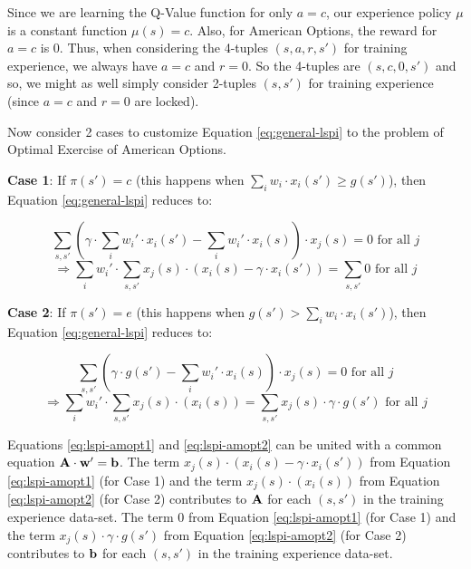 \documentclass[12pt]{amsart}
\begin{document}
Since we are learning the Q-Value function for only $a=c$, our experience policy $\mu$ is a constant function $\mu(s) = c$. Also, for American Options, the reward for $a=c$ is 0. Thus, when considering the 4-tuples $(s,a,r,s')$ for training experience, we always have $a=c$ and $r=0$. So the 4-tuples are $(s,c,0,s')$ and so, we might as well simply consider 2-tuples $(s,s')$ for training experience (since $a=c$ and $r=0$ are locked).

Now consider 2 cases to customize Equation \eqref{eq:general-lspi} to the problem of Optimal Exercise of American Options.

{\bf Case 1}: If $\pi(s') = c$ (this happens when $\sum_i w_i \cdot x_i(s') \geq g(s')$), then Equation \eqref{eq:general-lspi} reduces to:

$$\sum_{s,s'} (\gamma \cdot \sum_i w_i' \cdot x_i(s') - \sum_i w_i' \cdot x_i(s)) \cdot x_j(s) = 0 \text{ for all } j$$
\begin{equation}
\Rightarrow \sum_i w_i' \cdot \sum_{s,s'} x_j(s) \cdot (x_i(s) - \gamma \cdot x_i(s')) = \sum_{s,s'} 0 \text{ for all } j
\label{eq:lspi-amopt1}
\end{equation}

{\bf Case 2}: If $\pi(s') = e$ (this happens when $g(s') > \sum_i w_i \cdot x_i(s')$), then Equation \eqref{eq:general-lspi} reduces to:

$$\sum_{s,s'} (\gamma \cdot g(s') - \sum_i w_i' \cdot x_i(s)) \cdot x_j(s) = 0 \text{ for all } j$$
\begin{equation}
\Rightarrow \sum_i w_i' \cdot \sum_{s,s'} x_j(s) \cdot (x_i(s)) = \sum_{s,s'} x_j(s) \cdot \gamma \cdot g(s') \text{ for all } j
\label{eq:lspi-amopt2}
\end{equation}

Equations \eqref{eq:lspi-amopt1} and \eqref{eq:lspi-amopt2} can be united with a common equation ${\bf A} \cdot {\bf w'} = {\bf b}$.
The term $x_j(s) \cdot (x_i(s) - \gamma \cdot x_i(s'))$ from Equation \eqref{eq:lspi-amopt1} (for Case 1) and the term $x_j(s) \cdot (x_i(s))$ from Equation \eqref{eq:lspi-amopt2} (for Case 2) contributes to ${\bf A}$ for each $(s,s')$ in the training experience data-set. The term 0 from Equation \eqref{eq:lspi-amopt1} (for Case 1) and the term $x_j(s) \cdot \gamma \cdot g(s')$ from Equation \eqref{eq:lspi-amopt2} (for Case 2) contributes to ${\bf b}$ for each $(s,s')$ in the training experience data-set.
\end{document}
